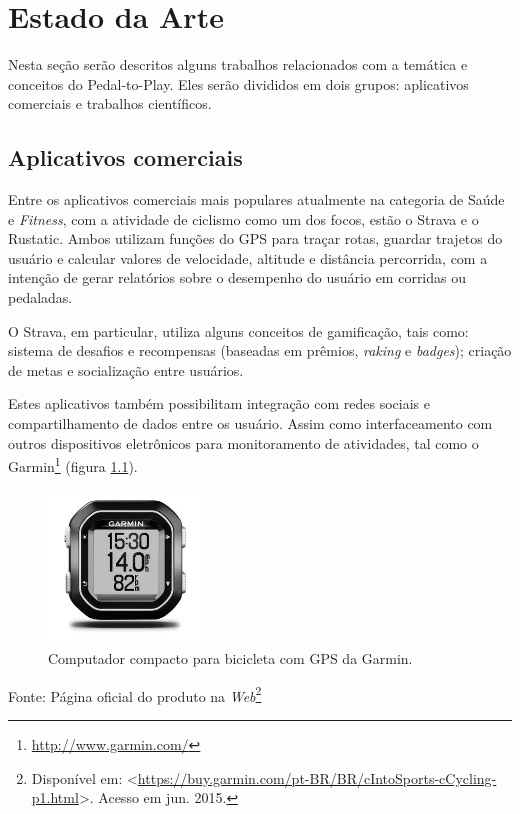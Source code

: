 \chapter{Estado da Arte} \label{cap:estadoarte}
Nesta seção serão descritos alguns trabalhos relacionados com a temática e conceitos do Pedal-to-Play. Eles serão divididos em dois grupos: aplicativos comerciais e trabalhos científicos.

\section{Aplicativos comerciais}
Entre os aplicativos comerciais mais populares atualmente na categoria de Saúde e \textit{Fitness}, com a atividade de ciclismo como um dos focos, estão o Strava e o Rustatic. Ambos utilizam funções do GPS para traçar rotas, guardar trajetos do usuário e calcular valores de velocidade, altitude e distância percorrida, com a intenção de gerar relatórios sobre o desempenho do usuário em corridas ou pedaladas. \par 

O Strava, em particular, utiliza alguns conceitos de gamificação, tais como: sistema de desafios e recompensas (baseadas em prêmios, \textit{raking} e \textit{badges}); criação de metas e socialização entre usuários. \par 

Estes aplicativos também possibilitam integração com redes sociais e compartilhamento de dados entre os usuário. Assim como interfaceamento com outros dispositivos eletrônicos para monitoramento de atividades, tal como o Garmin\footnote{\url{http://www.garmin.com/}} (figura \ref{fig:garmin}). \par 

\begin{figure}[h]
    \caption{Computador compacto para bicicleta com GPS da Garmin.}
    \centerline{\includegraphics[width=11em]{figuras/cf-lg.jpg}}
    \label{fig:garmin}
\end{figure}
\centerline{Fonte: Página oficial do produto na \textit{Web}\footnote{Disponível em:  <\url{https://buy.garmin.com/pt-BR/BR/cIntoSports-cCycling-p1.html}>. Acesso  em jun. 2015.}}

